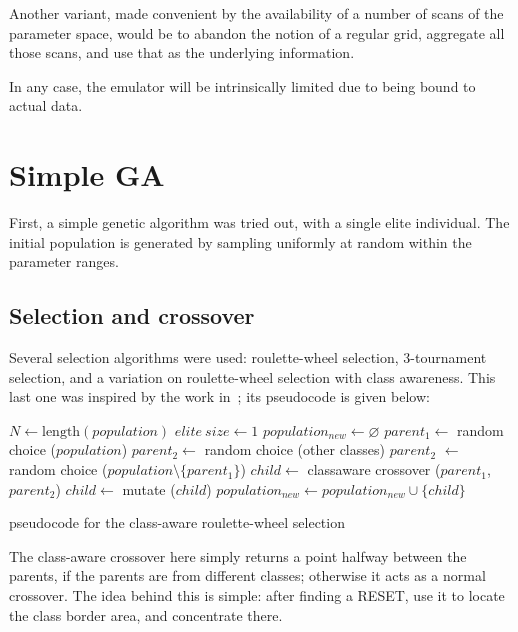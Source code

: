 \documentclass[times, utf8, diplomski]{fer}
\begin{document}
Another variant, made convenient by the availability of a number of scans of the
parameter space, would be to abandon the notion of a regular grid, aggregate all
those scans, and use that as the underlying information.


In any case, the emulator will be intrinsically limited due to being bound to
actual data.




\section{Simple GA}
First, a simple genetic algorithm was tried out, with a single elite individual.
The initial population is generated by sampling uniformly at random within the
parameter ranges.

\subsection{Selection and crossover}
Several selection algorithms were used: roulette-wheel selection, 3-tournament
selection, and a variation on roulette-wheel selection with class awareness.
This last one was inspired by the work in~\cite{GlitchItIfYouCan}; its
pseudocode is given below:
\begin{algorithm}
    \small
    \begin{algorithmic}
    \STATE $N \gets \text{length}(population)$
    \STATE $elite\ size \gets 1$
    \STATE $population_{new} \gets \varnothing$
        \STATE $parent_1  \gets$ random choice ($population$)
            \STATE $parent_2 \gets$ random choice (other classes)
        \ELSE
            \STATE $parent_2$ $\gets$ random choice ($population \setminus \{parent_1\}$)
        \ENDIF
        \STATE $child \gets$ classaware crossover ($parent_1$, $parent_2$)
        \STATE $child \gets$ mutate ($child$)
        \STATE $population_{new} \gets population_{new} \cup \{child\} $
    \ENDFOR
    \end{algorithmic}
    \caption{pseudocode for the class-aware roulette-wheel selection}
\end{algorithm}

The class-aware crossover here simply returns a point halfway between the parents,
if the parents are from different classes; otherwise it acts as a normal crossover.
The idea behind this is simple: after finding a RESET, use it to locate the class
border area, and concentrate there.
\end{document}
